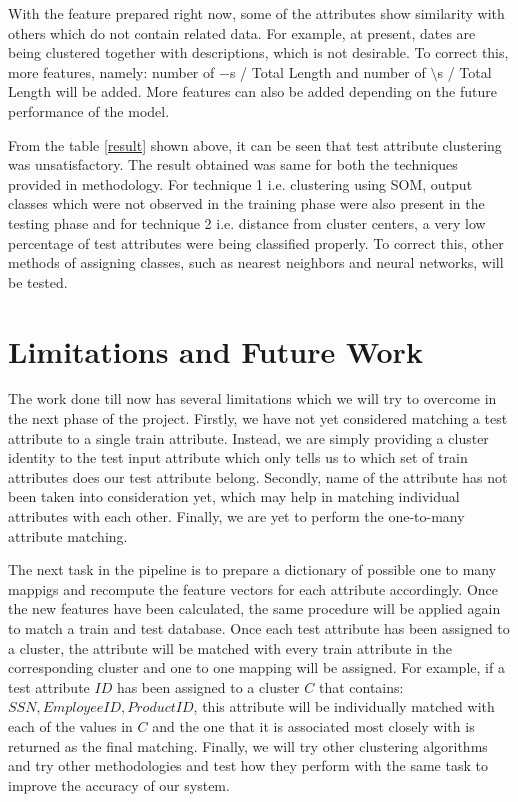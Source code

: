 \documentclass[conference]{IEEEtran}
\begin{document}
With the feature prepared right now, some of the attributes show similarity with others which do not contain related data. For example, at present, dates are being clustered together with descriptions, which is not desirable. To correct this, more features, namely: number of $-$s / Total Length and number of $\setminus$s / Total Length will be added. More features can also be added depending on the future performance of the model.

From the table \ref{result} shown above, it can be seen that test attribute clustering was unsatisfactory. The result obtained was same for both the techniques provided in methodology. For technique 1 i.e. clustering using SOM, output classes which were not observed in the training phase were also present in the testing phase and for technique 2 i.e. distance from cluster centers, a very low percentage of test attributes were being classified properly. To correct this, other methods of assigning classes, such as nearest neighbors and neural networks, will be tested.


\section{Limitations and Future Work}
The work done till now has several limitations which we will try to overcome in the next phase of the project. Firstly, we have not yet considered matching a test attribute to a single train attribute. Instead, we are simply providing a cluster identity to the test input attribute which only tells us to which set of train attributes does our test attribute belong. Secondly, name of the attribute has not been taken into consideration yet, which may help in matching individual attributes with each other. Finally, we are yet to perform the one-to-many attribute matching. 

The next task in the pipeline is to prepare a dictionary of possible one to many mappigs and recompute the feature vectors for each attribute accordingly. Once the new features have been calculated, the same procedure will be applied again to match a train and test database. Once each test attribute has been assigned to a cluster, the attribute will be matched with every train attribute in the corresponding cluster and one to one mapping will be assigned. For example, if a test attribute $ID$ has been assigned to a cluster $C$ that contains: ${SSN, Employee ID, Product ID}$, this attribute will be individually matched with each of the values in $C$ and the one that it is associated most closely with is returned as the final matching. Finally, we will try other clustering algorithms and try other methodologies and test how they perform with the same task to improve the accuracy of our system.
\end{document}
